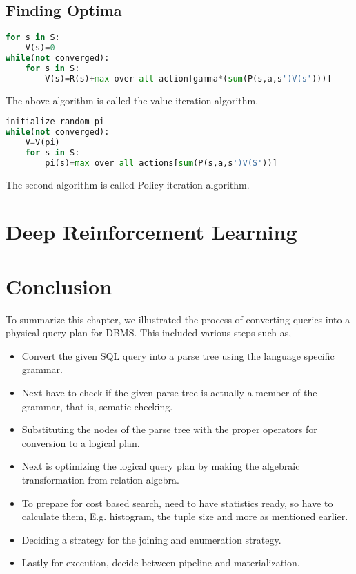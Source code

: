\subsection{Finding Optima}
\begin{lstlisting}[language=python]
for s in S:
    V(s)=0
while(not converged):
    for s in S:
        V(s)=R(s)+max over all action[gamma*(sum(P(s,a,s')V(s')))]
\end{lstlisting}
The above algorithm is called the value iteration algorithm.
\begin{lstlisting}[language=python]
initialize random pi
while(not converged):
    V=V(pi)
    for s in S:
        pi(s)=max over all actions[sum(P(s,a,s')V(S'))]
\end{lstlisting}
The second algorithm is called Policy iteration algorithm.

\section{Deep Reinforcement Learning}


\section{Conclusion}
To summarize this chapter, we illustrated the process of converting queries into a physical query plan for DBMS. This included various steps such as, 
\begin{itemize}
    \item Convert the given SQL query into a parse tree using the language specific grammar.
    \item Next have to check if the given parse tree is actually a member of the grammar, that is, sematic checking.
    \item Substituting the nodes of the parse tree with the proper operators for conversion to a logical plan.
    \item Next is optimizing the logical query plan by making the algebraic transformation from relation algebra.
    \item To prepare for cost based search, need to have statistics ready, so have to calculate them, E.g. histogram, the tuple size and more as mentioned earlier.
    \item Deciding a strategy for the joining and enumeration strategy.
    \item Lastly for execution, decide between pipeline and materialization.
\end{itemize}

